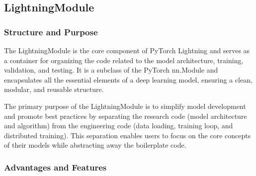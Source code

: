 \documentclass[12pt]{article}
\begin{document}
\subsection{LightningModule}

\subsubsection{Structure and Purpose}

The LightningModule is the core component of PyTorch Lightning and serves as a container for organizing the code related to the model architecture, training, validation, and testing.
It is a subclass of the PyTorch nn.Module and encapsulates all the essential elements of a deep learning model, ensuring a clean, modular, and reusable structure.

The primary purpose of the LightningModule is to simplify model development and promote best practices by separating the research code (model architecture and algorithm) from the engineering code (data loading, training loop, and distributed training).
This separation enables users to focus on the core concepts of their models while abstracting away the boilerplate code.

\subsubsection{Advantages and Features}
\end{document}
